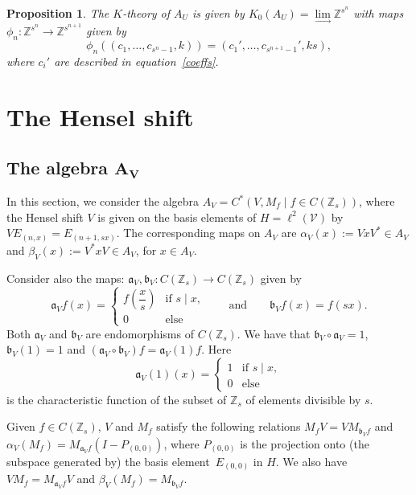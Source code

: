 \documentclass[pdftex]{sigma}
\newcommand{\Z}{{\mathbb Z}}
\numberwithin{equation}{section}
\newtheorem{Proposition}[Theorem]{Proposition}
 { \theoremstyle{definition}
\newtheorem{Definition}[Theorem]{Definition}
\newtheorem{Note}[Theorem]{Note}
\newtheorem{Example}[Theorem]{Example}
\newtheorem{Remark}[Theorem]{Remark} }
\begin{document}
\begin{Proposition}
The $K$-theory of $A_U$ is given by
$K_0(A_U) = \lim\limits_{\longrightarrow}\Z^{s^n}$
with maps $\phi_n\colon\Z^{s^n} \to \Z^{s^{n+1}}$ given by
\begin{equation*}
\phi_n((c_1,\dots,c_{s^n-1},k)) = (c_1',\dots,c_{s^{n+1}-1}',ks),
\end{equation*}
where $c_i'$ are described in equation~\eqref{coeffs}.
\end{Proposition}

\section{The Hensel shift}
\subsection[The algebra A\_V]{The algebra $\boldsymbol{A_V}$}
In this section, we consider the algebra
$
A_V=C^*(V,M_f\mid f\in C(\Z_s))$,
where the Hensel shift $V$ is given on the basis elements of $H=\ell^2(\mathcal{V})$ by $VE_{(n,x)} = E_{(n+1, sx)}$.
The corresponding maps on $A_V$ are
$
\alpha_V(x):=V x V^* \in A_V$ and $ \beta_V(x):=V^* x V \in A_V$,
for $x\in A_V$.

Consider also the maps: $\mathfrak{a}_V,\mathfrak{b}_V\colon C(\Z_s)\to C(\Z_s)$ given by
\begin{equation*}
\mathfrak{a}_Vf(x) =
\begin{cases}
f\left(\dfrac{x}{s}\right) &\textrm{if }s\mid x,\\
0 &\textrm{else}
\end{cases}\qquad\text{and}\qquad \mathfrak{b}_Vf(x)=f(sx) .
\end{equation*}
Both $\mathfrak{a}_V$ and $\mathfrak{b}_V$ are endomorphisms of $C(\Z_s)$. We have that
$\mathfrak{b}_V\circ\mathfrak{a}_V=1$, $ \mathfrak{b}_V(1)=1$ and $(\mathfrak{a}_V\circ \mathfrak{b}_V)f=\mathfrak{a}_V(1)f$.
Here
\begin{equation*}
\mathfrak{a}_V (1)(x) =
\begin{cases}
1 &\textrm{if }s\mid x, \\
0 &\textrm{else}
\end{cases}
\end{equation*}
is the characteristic function of the subset of $\Z_s$ of elements divisible by $s$.

Given $f\in C(\Z_s)$, $V$ and $M_f$ satisfy the following relations
$
M_fV=VM_{\mathfrak{b}_Vf}$ and $ \alpha_V(M_f)=M_{\mathfrak{a}_Vf}(I-P_{(0,0)}) $,
where $P_{(0,0)}$ is the projection onto (the subspace generated by) the basis element~$E_{(0,0)}$ in $H$.
We also have
$
VM_f=M_{\mathfrak{a}_Vf}V $ and $ \beta_V(M_f) = M_{\mathfrak{b}_V f}$.
\end{document}
